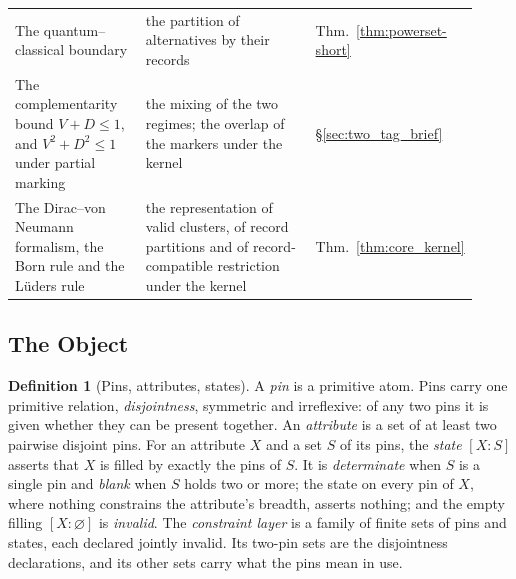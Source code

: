 \documentclass[11pt]{article}
\theoremstyle{definition}
\newtheorem{definition}{Definition}
\begin{document}
\begin{table}[t]
\begin{tabular}{@{}p{0.30\linewidth}p{0.45\linewidth}p{0.17\linewidth}@{}}
The quantum--classical boundary & the partition of alternatives by their records & Thm.~\ref{thm:powerset-short} \\
The complementarity bound $V + D \le 1$, and $V^{2} + D^{2} \le 1$ under partial marking & the mixing of the two regimes; the overlap of the markers under the kernel & \S\ref{sec:two_tag_brief} \\
The Dirac--von Neumann formalism, the Born rule and the L\"uders rule & the representation of valid clusters, of record partitions and of record-compatible restriction under the kernel & Thm.~\ref{thm:core_kernel} \\
\bottomrule
\end{tabular}
\end{table}

\subsection{The Object}\label{sec:core_object}

\begin{definition}[Pins, attributes, states]\label{def:core_pins}
A \emph{pin} is a primitive atom. Pins carry one primitive relation, \emph{disjointness}, symmetric and irreflexive: of any two pins it is given whether they can be present together. An \emph{attribute} is a set of at least two pairwise disjoint pins. For an attribute $X$ and a set $S$ of its pins, the \emph{state} $[X : S]$ asserts that $X$ is filled by exactly the pins of $S$. It is \emph{determinate} when $S$ is a single pin and \emph{blank} when $S$ holds two or more; the state on every pin of $X$, where nothing constrains the attribute's breadth, asserts nothing; and the empty filling $[X : \varnothing]$ is \emph{invalid}. The \emph{constraint layer} is a family of finite sets of pins and states, each declared jointly invalid. Its two-pin sets are the disjointness declarations, and its other sets carry what the pins mean in use.
\end{definition}
\end{document}

